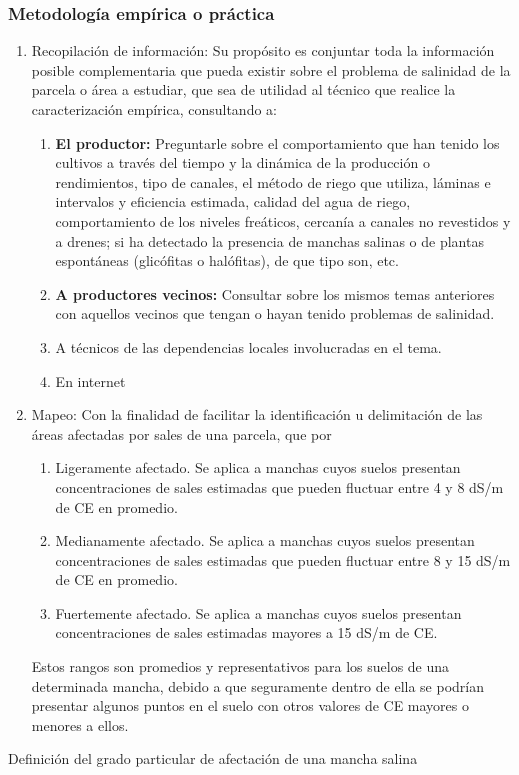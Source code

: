 \subsubsection{Metodología empírica o práctica}
\begin{enumerate}
    \item Recopilación de información: Su propósito es conjuntar toda la información posible complementaria que pueda
    existir sobre el problema de salinidad de la parcela o área a estudiar, que sea de
    utilidad al técnico que realice la caracterización empírica, consultando a:
    \begin{enumerate}
        \item \textbf{El productor:} Preguntarle sobre el comportamiento que han tenido los cultivos a través del tiempo y la dinámica de la producción o rendimientos, tipo de canales, el método de riego que utiliza, láminas e intervalos y eficiencia estimada, calidad del agua de riego, comportamiento de los niveles freáticos, cercanía a canales no revestidos y a drenes; si ha detectado la presencia de manchas salinas o de plantas espontáneas (glicófitas o halófitas), de que tipo son, etc.
        \item \textbf{A productores vecinos:} Consultar sobre los mismos temas anteriores con aquellos vecinos que tengan o hayan tenido problemas de salinidad.
        \item A técnicos de las dependencias locales involucradas en el tema.
        \item En internet
    \end{enumerate}
    \item Mapeo: Con la finalidad de facilitar la identificación u delimitación de las áreas afectadas por sales de una parcela, que por \begin{enumerate}
      \item Ligeramente afectado. Se aplica a manchas cuyos suelos presentan concentraciones de sales estimadas que pueden fluctuar entre 4 y 8 dS/m de CE en promedio.
      \item Medianamente afectado. Se aplica a manchas cuyos suelos presentan concentraciones de sales estimadas que pueden fluctuar entre 8 y 15 dS/m de CE en promedio.
      \item Fuertemente afectado. Se aplica a manchas cuyos suelos presentan concentraciones de sales estimadas mayores a 15 dS/m de CE.
  \end{enumerate}
  Estos rangos son promedios y representativos para los suelos de una determinada mancha, debido a que seguramente dentro de ella se podrían presentar algunos puntos en el suelo con otros valores de CE mayores o menores a ellos.
\end{enumerate}
Definición del grado particular de afectación de una mancha salina


